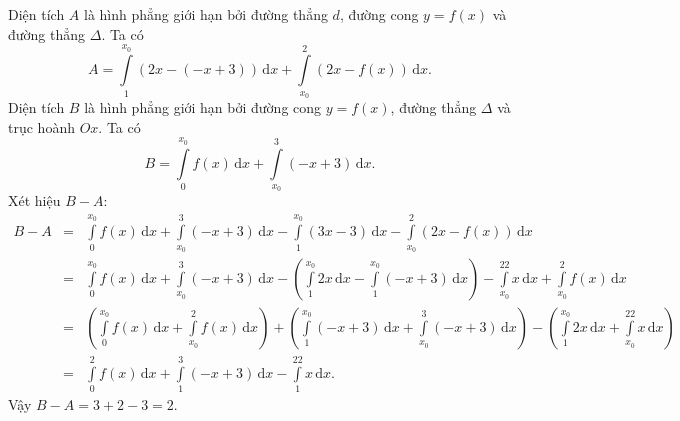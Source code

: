 \begin{ex}
{		Diện tích $A$ là hình phẳng giới hạn bởi đường thẳng $d$, đường cong $y=f(x)$ và đường thẳng $\Delta$. Ta có
		\[A=\displaystyle\int\limits_1^{x_0}(2x-(-x+3))\,\mathrm{d}x+\displaystyle\int\limits_{x_0}^2(2x-f(x))\,\mathrm{d}x.\]
		Diện tích $B$ là hình phẳng giới hạn bởi đường cong $y=f(x)$, đường thẳng $\Delta$ và trục hoành $Ox$. Ta có
		\[B=\displaystyle\int\limits_0^{x_0}f(x)\,\mathrm{d}x+\displaystyle\int\limits_{x_0}^3(-x+3)\,\mathrm{d}x.\]
		Xét hiệu $B-A$:
		\begin{eqnarray*}
			B-A&=&\displaystyle\int\limits_0^{x_0}f(x)\,\mathrm{d}x+\displaystyle\int\limits_{x_0}^3(-x+3)\,\mathrm{d}x-\displaystyle\int\limits_1^{x_0}(3x-3)\,\mathrm{d}x-\displaystyle\int\limits_{x_0}^2(2x-f(x))\,\mathrm{d}x\\
			&=&\displaystyle\int\limits_0^{x_0}f(x)\,\mathrm{d}x+\displaystyle\int\limits_{x_0}^3(-x+3)\,\mathrm{d}x-\left(\displaystyle\int\limits_1^{x_0}2x\,\mathrm{d}x-\displaystyle\int\limits_1^{x_0}(-x+3)\,\mathrm{d}x\right)-\displaystyle\int\limits_{x_0}^22x\,\mathrm{d}x+\displaystyle\int\limits_{x_0}^2f(x)\,\mathrm{d}x\\
			&=&\left(\displaystyle\int\limits_0^{x_0}f(x)\,\mathrm{d}x+\displaystyle\int\limits_{x_0}^2f(x)\,\mathrm{d}x\right)+\left(\displaystyle\int\limits_1^{x_0}(-x+3)\,\mathrm{d}x+\displaystyle\int\limits_{x_0}^3(-x+3)\,\mathrm{d}x\right)-\left(\displaystyle\int\limits_1^{x_0}2x\,\mathrm{d}x+\displaystyle\int\limits_{x_0}^22x\,\mathrm{d}x\right)\\
			&=&\displaystyle\int\limits_0^2f(x)\,\mathrm{d}x+\displaystyle\int\limits_1^3(-x+3)\,\mathrm{d}x-\displaystyle\int\limits_1^22x\,\mathrm{d}x.
		\end{eqnarray*}
		Vậy $B-A=3+2-3=2$.
	}
\end{ex}
